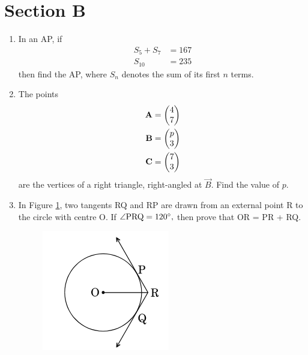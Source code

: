\documentclass[journal,12pt,twocolumn]{IEEEtran}
\renewcommand\thesection{\arabic{section}}
\begin{document}
\section{Section B}
\renewcommand{\theequation}{\theenumi}
\begin{enumerate}[label=\thesection.\arabic*.,ref=\thesection.\theenumi]
\item In an AP, if 
\begin{align}
 S_5 + S_7 &= 167\\  
 S_{10}&= 235
\end{align}
then find the AP, where $S_n$ denotes the sum of its first $n$ terms.
\item The points 
\begin{align}
 \mathbf{A}&= \begin{pmatrix}4 \\ 7\end{pmatrix}\\  
 \mathbf{B}&=\begin{pmatrix}p \\ 3\end{pmatrix}\\  
 \mathbf{C}&=\begin{pmatrix}7 \\ 3\end{pmatrix}
\end{align}
are the vertices of a right triangle, right-angled at $ \vec{B} $. Find the value of $p$.
\item In Figure \ref{Figure 3}, two tangents RQ and RP are drawn from an external point R to the circle with centre O. If $\angle \text{PRQ} = 120 \degree,$ then prove that OR = PR + RQ.
  \begin{figure}[h!]
	\centering
    \includegraphics[width=0.8\columnwidth,center]{./figs/image3.png}
	\caption{}
	\label{Figure 3}
\end{figure}

\end{enumerate}
\end{document}
